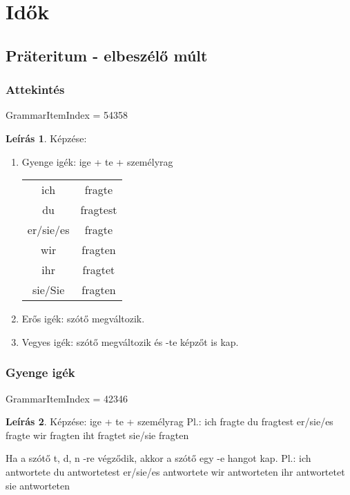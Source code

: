 \documentclass{article}
\theoremstyle{definition}
\newtheorem*{desc}{Leírás}
\begin{document}
\section{Idők}

\subsection{Präteritum - elbeszélő múlt}

\subsubsection{Attekintés}

GrammarItemIndex = 54358

\begin{desc}
Képzése:
\begin{enumerate}
\item
Gyenge igék: ige + te + személyrag

\begin{tabular}{cc}
 ich & fragte \\
 du & fragtest \\
 er/sie/es & fragte \\
 wir & fragten \\
 ihr & fragtet \\
 sie/Sie & fragten
\end{tabular}

\item
Erős igék: szótő megváltozik.
\item
Vegyes igék: szótő megváltozik és -te képzőt is kap.
\end{enumerate}
\end{desc}

\subsubsection{Gyenge igék}

GrammarItemIndex = 42346

\begin{desc}
Képzése: ige + te + személyrag
Pl.:
ich fragte
du fragtest
er/sie/es fragte
wir fragten
iht fragtet
sie/sie fragten

Ha a szótő t, d, n -re végződik, akkor a szótő egy -e hangot kap.
Pl.:
ich	antwortete
du	antwortetest
er/sie/es	antwortete
wir	antworteten
ihr antwortetet
sie	antworteten
\end{desc}
\end{document}
